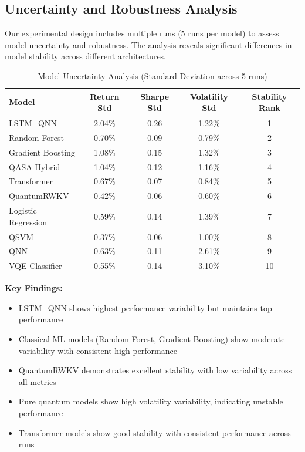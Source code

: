 \documentclass[12pt,a4paper]{article}
\begin{document}
\subsection{Uncertainty and Robustness Analysis}

Our experimental design includes multiple runs (5 runs per model) to assess model uncertainty and robustness. The analysis reveals significant differences in model stability across different architectures.

\begin{table}[H]
\centering
\begin{tabular}{@{}lcccc@{}}
\toprule
\textbf{Model} & \textbf{Return Std} & \textbf{Sharpe Std} & \textbf{Volatility Std} & \textbf{Stability Rank} \\
\midrule
LSTM\_QNN & 2.04\% & 0.26 & 1.22\% & 1 \\
Random Forest & 0.70\% & 0.09 & 0.79\% & 2 \\
Gradient Boosting & 1.08\% & 0.15 & 1.32\% & 3 \\
QASA Hybrid & 1.04\% & 0.12 & 1.16\% & 4 \\
Transformer & 0.67\% & 0.07 & 0.84\% & 5 \\
QuantumRWKV & 0.42\% & 0.06 & 0.60\% & 6 \\
Logistic Regression & 0.59\% & 0.14 & 1.39\% & 7 \\
QSVM & 0.37\% & 0.06 & 1.00\% & 8 \\
QNN & 0.63\% & 0.11 & 2.61\% & 9 \\
VQE Classifier & 0.55\% & 0.14 & 3.10\% & 10 \\
\bottomrule
\end{tabular}
\caption{Model Uncertainty Analysis (Standard Deviation across 5 runs)}
\end{table}

\textbf{Key Findings:}
\begin{itemize}
    \item LSTM\_QNN shows highest performance variability but maintains top performance
    \item Classical ML models (Random Forest, Gradient Boosting) show moderate variability with consistent high performance
    \item QuantumRWKV demonstrates excellent stability with low variability across all metrics
    \item Pure quantum models show high volatility variability, indicating unstable performance
    \item Transformer models show good stability with consistent performance across runs
\end{itemize}
\end{document}

